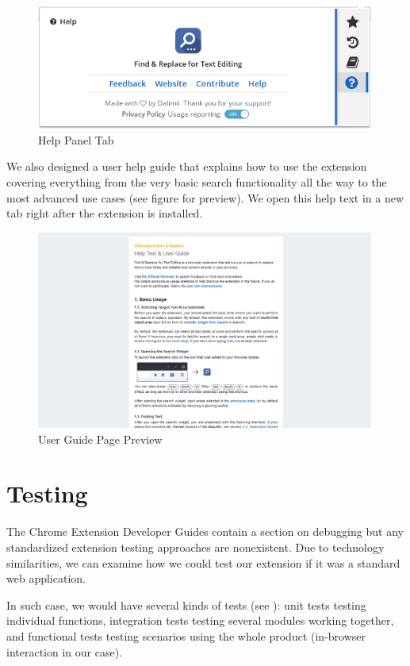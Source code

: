 \documentclass[bsc,frontabs,twoside,singlespacing,parskip,deptreport]{infthesis}
\begin{document}
\begin{figure}[h]
\centering
\includegraphics[width=0.99\textwidth]{../main/images/help/help-panel.png}
\caption{Help Panel Tab}
\end{figure}

We also designed a user help guide that explains how to use the extension covering everything from the very basic search functionality all the way to the most advanced use cases (see figure for preview). We open this help text in a new tab right after the extension is installed.

\begin{figure}[h]
\centering
\includegraphics[width=0.99\textwidth]{../docs/help-text-screenshot.png}
\caption{User Guide Page Preview}
\end{figure}

\section{Testing}
The Chrome Extension Developer Guides contain a section on debugging \cite{C3} but any standardized extension testing approaches are nonexistent. Due to technology similarities, we can examine how we could test our extension if it was a standard web application.

In such case, we would have several kinds of tests (see \cite{A11}): unit tests testing individual functions, integration tests testing several modules working together, and functional tests testing scenarios using the whole product (in-browser interaction in our case).
\end{document}
